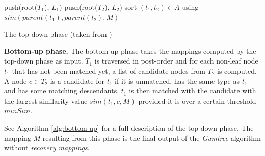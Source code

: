 \documentclass[letterpaper]{article}
\newcommand{\mypar}[1]{{\bf #1.}}
\begin{document}
\begin{algorithm}
	push(root($T_1$), $L_1$)\;
	push(root($T_2$), $L_2$)\;
	sort $(t_1,t_2) \in A$ using $sim(parent(t_1),parent(t_2), M)$\;
\caption{The top-down phase (taken from \cite{falleri:2014:structure_diff})}
\label{alg:top-down}
\end{algorithm}

\mypar{Bottom-up phase}
The bottom-up phase takes the mappings computed by the top-down phase as input.
$T_1$ is traversed in post-order and for each non-leaf node $t_1$ that has not been matched yet, a list of candidate nodes from $T_2$ is computed.
A node $c \in T_2$ is a candidate for $t_1$ if it is unmatched, has the same type as $t_1$ and has some matching descendants.
$t_1$ is then matched with the candidate with the largest similarity value $sim(t_1,c,M)$ provided it is over a certain threshold $minSim$.

See Algorithm \ref{alg:bottom-up} for a full description of the top-down phase.
The mapping $M$ resulting from this phase is the final output of the \emph{Gumtree} algorithm without \emph{recovery mappings}.
\end{document}
